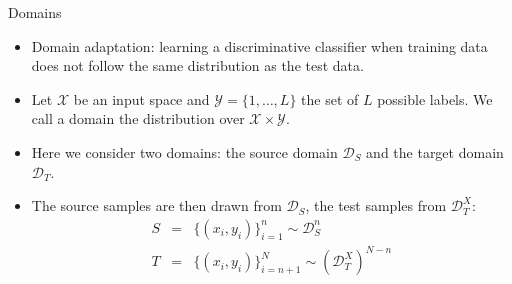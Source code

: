 \documentclass[xcolor=pdftex,dvipsnames,table]{beamer}
\begin{document}


\begin{frame}{Domains}
\begin{itemize}
\item Domain adaptation: learning a discriminative classifier when training data does not follow the same distribution as the test data.
\item Let $\mathcal{X}$ be an input space and $\mathcal{Y} = \{ 1, \ldots, L\}$ the set of $L$ possible labels. We call a domain the distribution over $\mathcal{X} \times \mathcal{Y}$. 
\item Here we consider two domains: the source domain $\mathcal{D}_S$ and the target domain $\mathcal{D}_T$. 
\item The source samples are then drawn from $\mathcal{D}_S$, the test samples from $\mathcal{D}^X_T$: 
\begin{eqnarray}
S &=& \{(x_i, y_i)\}_{i=1}^n \sim \mathcal{D}_S^n \nonumber \\
T &=& \{(x_i, y_i)\}_{i=n+1}^N \sim (\mathcal{D}^X_T)^{N-n} \nonumber 
\end{eqnarray}
\end{itemize}
\end{frame}
\end{document}
